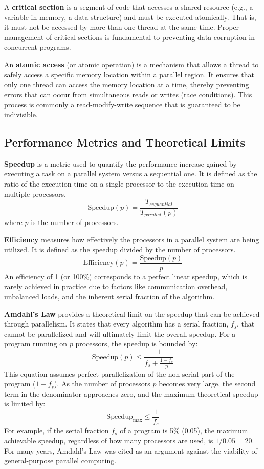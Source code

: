 A \textbf{critical section} is a segment of code that accesses a shared resource (e.g., a variable in memory, a data structure) and must be executed atomically. That is, it must not be accessed by more than one thread at the same time. Proper management of critical sections is fundamental to preventing data corruption in concurrent programs.

An \textbf{atomic access} (or atomic operation) is a mechanism that allows a thread to safely access a specific memory location within a parallel region. It ensures that only one thread can access the memory location at a time, thereby preventing errors that can occur from simultaneous reads or writes (race conditions). This process is commonly a read-modify-write sequence that is guaranteed to be indivisible.

\subsection{Performance Metrics and Theoretical Limits}

\textbf{Speedup} is a metric used to quantify the performance increase gained by executing a task on a parallel system versus a sequential one. It is defined as the ratio of the execution time on a single processor to the execution time on multiple processors.
$$ \text{Speedup}(p) = \frac{T_{sequential}}{T_{parallel}(p)} $$
where $p$ is the number of processors.

\textbf{Efficiency} measures how effectively the processors in a parallel system are being utilized. It is defined as the speedup divided by the number of processors.
$$ \text{Efficiency}(p) = \frac{\text{Speedup}(p)}{p} $$
An efficiency of 1 (or 100\%) corresponds to a perfect linear speedup, which is rarely achieved in practice due to factors like communication overhead, unbalanced loads, and the inherent serial fraction of the algorithm.

\textbf{Amdahl's Law} provides a theoretical limit on the speedup that can be achieved through parallelism. It states that every algorithm has a serial fraction, $f_s$, that cannot be parallelized and will ultimately limit the overall speedup. For a program running on $p$ processors, the speedup is bounded by:
$$ \text{Speedup}(p) \le \frac{1}{f_s + \frac{1 - f_s}{p}} $$
This equation assumes perfect parallelization of the non-serial part of the program ($1 - f_s$). As the number of processors $p$ becomes very large, the second term in the denominator approaches zero, and the maximum theoretical speedup is limited by:
$$ \text{Speedup}_{\text{max}} \le \frac{1}{f_s} $$
For example, if the serial fraction $f_s$ of a program is 5\% (0.05), the maximum achievable speedup, regardless of how many processors are used, is $1/0.05 = 20$. For many years, Amdahl's Law was cited as an argument against the viability of general-purpose parallel computing.

